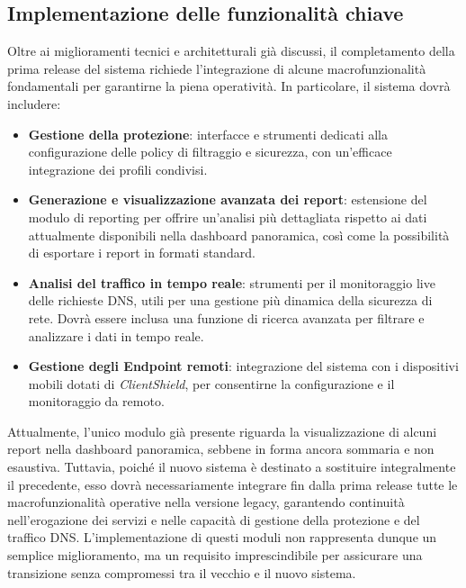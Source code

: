 \subsection{Implementazione delle funzionalità chiave}
Oltre ai miglioramenti tecnici e architetturali già discussi, il completamento della prima release del sistema richiede l’integrazione di alcune macrofunzionalità fondamentali per garantirne la piena operatività. In particolare, il sistema dovrà includere:
\begin{itemize}
  \item \textbf{Gestione della protezione}: interfacce e strumenti dedicati alla configurazione delle policy di filtraggio e sicurezza, con un'efficace integrazione dei profili condivisi.
  \item \textbf{Generazione e visualizzazione avanzata dei report}: estensione del modulo di reporting per offrire un’analisi più dettagliata rispetto ai dati attualmente disponibili nella dashboard panoramica, così come la possibilità di esportare i report in formati standard.
  \item \textbf{Analisi del traffico in tempo reale}: strumenti per il monitoraggio live delle richieste DNS, utili per una gestione più dinamica della sicurezza di rete. Dovrà essere inclusa una funzione di ricerca avanzata per filtrare e analizzare i dati in tempo reale.
  \item \textbf{Gestione degli Endpoint remoti}: integrazione del sistema con i dispositivi mobili dotati di \textit{ClientShield}, per consentirne la configurazione e il monitoraggio da remoto.
\end{itemize}

Attualmente, l’unico modulo già presente riguarda la visualizzazione di alcuni report nella dashboard panoramica, sebbene in forma ancora sommaria e non esaustiva. Tuttavia, poiché il nuovo sistema è destinato a sostituire integralmente il precedente, esso dovrà necessariamente integrare fin dalla prima release tutte le macrofunzionalità operative nella versione legacy, garantendo continuità nell’erogazione dei servizi e nelle capacità di gestione della protezione e del traffico DNS. L’implementazione di questi moduli non rappresenta dunque un semplice miglioramento, ma un requisito imprescindibile per assicurare una transizione senza compromessi tra il vecchio e il nuovo sistema.
